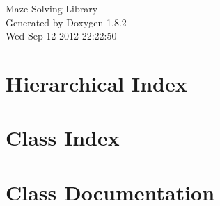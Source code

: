 \documentclass{book}
\begin{document}
\hypersetup{pageanchor=false,citecolor=blue}
\begin{titlepage}
\vspace*{7cm}
\begin{center}
{\Large Maze Solving Library }\\
\vspace*{1cm}
{\large Generated by Doxygen 1.8.2}\\
\vspace*{0.5cm}
{\small Wed Sep 12 2012 22:22:50}\\
\end{center}
\end{titlepage}
\clearemptydoublepage
{}
\tableofcontents
\clearemptydoublepage
{}
\hypersetup{pageanchor=true,citecolor=blue}
\chapter{Hierarchical Index}

\chapter{Class Index}

\chapter{Class Documentation}














\printindex
\end{document}
